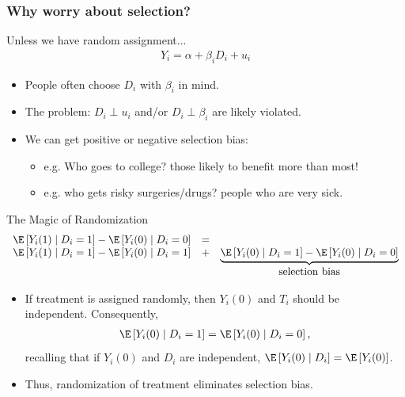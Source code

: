 \documentclass[aspectratio=169,11pt]{beamer}
\begin{document}
\begin{frame}
\frametitle{Why worry about selection?}
Unless we have random assignment...
\begin{align*}
Y_i = \alpha + \beta_i D_i + u_i
\end{align*}

\begin{itemize}
\item People often choose $D_i$ with $\beta_i$ in mind.
\item The problem: $D_i \perp u_i$ and/or $D_i \perp \beta_i$ are likely violated.
\item We can get positive or negative selection bias:
\begin{itemize}
\item e.g. Who goes to college? those likely to benefit more than most!
\item e.g. who gets risky surgeries/drugs? people who are very sick.
\end{itemize}
\end{itemize}
\end{frame}


\begin{frame}{The Magic of Randomization}
\begin{align*}
\begin{array}{ccc}
\E\left[Y_{i}(1) \mid D_{i}=1\right]-\E\left[Y_{i}(0) \mid D_{i}=0\right] & =\\
\E\left[Y_{i}(1) \mid D_{i}=1\right]-\E\left[Y_{i}(0) \mid D_{i}=1\right] & + & \underbrace{\E\left[Y_{i}(0) \mid D_{i}=1\right]-\E\left[Y_{i}(0) \mid D_{i}=0\right]}\\
 &  & \text{selection bias}
\end{array}
\end{align*}
\begin{itemize}
  \item If treatment is assigned randomly, then $Y_{i}(0)$ and $T_{i}$ should be independent. Consequently,
  \begin{align*}
    \E\left[Y_{i}(0)\mid D_{i}=1\right]=\E\left[Y_{i}(0) \mid D_{i}=0\right],
  \end{align*}
recalling that if $Y_{i}(0)$ and $D_{i}$ are independent, $\E\left[Y_{i}(0) \mid D_{i}\right]=\E\left[Y_{i}(0)\right]$.

\item Thus, randomization of treatment eliminates selection bias.
\end{itemize}
\end{frame}
\end{document}
